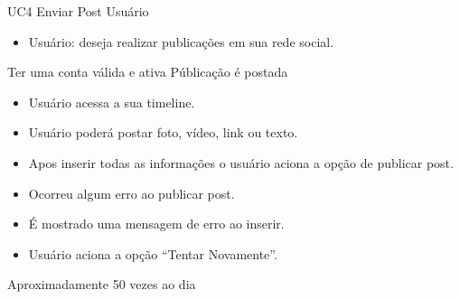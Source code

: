 \casoDeUso
{UC4}
{Enviar Post}
{Usuário}
{
\begin{itemize}
	\item Usuário: deseja realizar publicações em sua rede social.
\end{itemize}

}
{Ter uma conta válida e ativa}
{Públicação é postada}
{
\begin{itemize}
\item Usuário acessa a sua timeline.
\item Usuário poderá postar foto, vídeo, link ou texto.
\item Apos inserir todas as informações o usuário aciona a opção de publicar post.
\end{itemize}
}
{
\begin{itemize}
\item Ocorreu algum erro ao publicar post.
\item É mostrado uma mensagem de erro ao inserir.
\item Usuário aciona a opção “Tentar Novamente”.
\end{itemize}
}
{Aproximadamente 50 vezes ao dia}
{

}
